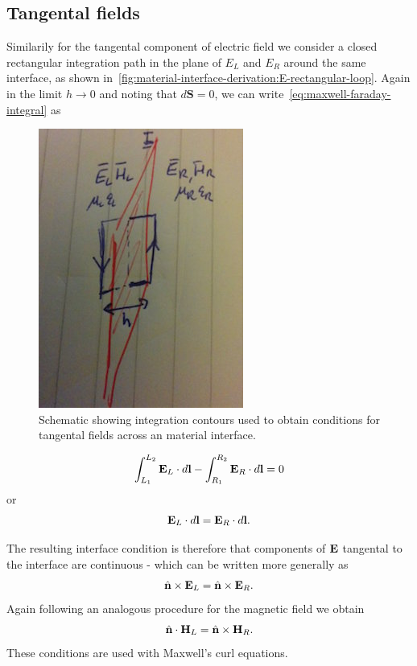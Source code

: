 \subsection{Tangental fields}

Similarily for the tangental component of electric field we consider a closed rectangular integration path in the plane of $E_L$ and $E_R$ around the same interface, as shown in~\eqref{fig:material-interface-derivation:E-rectangular-loop}. Again in the limit $h \to 0$ and noting that $d\mathbf{S} = 0$, we can write~\eqref{eq:maxwell-faraday-integral} as
\begin{figure}[htbp!]
\begin{center}
    \includegraphics[scale=0.9]{Figures/Chapters/PhysicalProblem/interfaceContour}
\end{center}
\caption{Schematic showing integration contours used to obtain conditions for tangental fields across an material interface.}
\label{fig:material-interface-derivation:E-rectangular-loop}
\end{figure}
\begin{equation}
\label{eq:material-interfaces-tangentalcondition-E}
\int_{L_1}^{L_2} \mathbf{E}_L \cdot d\mathbf{l} - \int_{R_1}^{R_2} \mathbf{E}_R \cdot d \mathbf{l} = 0
\end{equation}
or
$$
\mathbf{E}_L \cdot d\mathbf{l} = \mathbf{E}_R \cdot d \mathbf{l} .
$$

The resulting interface condition is therefore that components of $\mathbf{E}$ tangental to the interface are continuous - which can be written more generally as
$$
\hat{\mathbf{n}} \times \mathbf{E}_L = \hat{\mathbf{n}} \times \mathbf{E}_R .
$$
Again following an analogous procedure for the magnetic field we obtain
$$
\hat{\mathbf{n}} \cdot \mathbf{H}_L = \hat{\mathbf{n}} \times \mathbf{H}_R .
$$
These conditions are used with Maxwell's curl equations.

